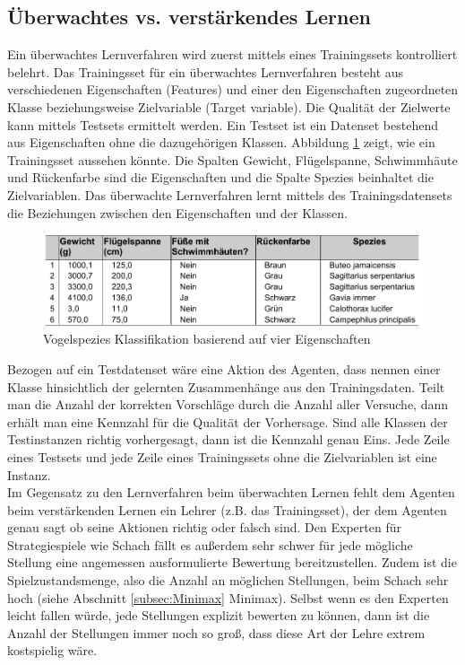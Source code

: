 \subsection{Überwachtes \acs{vs.} verstärkendes Lernen}
Ein überwachtes Lernverfahren wird zuerst mittels eines Trainingssets kontrolliert belehrt. Das Trainingsset für ein überwachtes Lernverfahren besteht aus verschiedenen Eigenschaften (Features) und einer den Eigenschaften zugeordneten Klasse beziehungsweise Zielvariable (Target variable). Die Qualität der Zielwerte kann mittels Testsets ermittelt werden. Ein Testset ist ein Datenset bestehend aus Eigenschaften ohne die dazugehörigen Klassen. Abbildung \ref{fig:vogel_spezies} zeigt, wie ein Trainingsset aussehen könnte\cite[8]{Harrington}. Die Spalten Gewicht, Flügelspanne, Schwimmhäute und Rückenfarbe sind die Eigenschaften und die Spalte Spezies beinhaltet die Zielvariablen. Das überwachte Lernverfahren lernt mittels des Trainingsdatensets die Beziehungen zwischen den Eigenschaften und der Klassen. \\

\begin{figure}[!htbp]
  \centering
  \includegraphics[scale = 0.89]{inhalt/abbildungen/vogel_spezies.pdf}
  \caption{Vogelspezies Klassifikation basierend auf vier Eigenschaften}
  \label{fig:vogel_spezies}
\end{figure} 

Bezogen auf ein Testdatenset wäre eine Aktion des Agenten, dass nennen einer Klasse hinsichtlich der gelernten Zusammenhänge aus den Trainingsdaten. Teilt man die Anzahl der korrekten Vorschläge durch die Anzahl aller Versuche, dann erhält man eine Kennzahl für die Qualität der Vorhersage. Sind alle Klassen der Testinstanzen richtig vorhergesagt, dann ist die Kennzahl genau Eins. Jede Zeile eines Testsets und jede Zeile eines Trainingssets ohne die Zielvariablen ist eine Instanz. \\

Im Gegensatz zu den Lernverfahren beim überwachten Lernen fehlt dem Agenten beim verstärkenden Lernen ein Lehrer (z.B. das Trainingsset), der dem Agenten genau sagt ob seine Aktionen richtig oder falsch sind. Den Experten für Strategiespiele wie Schach fällt es außerdem sehr schwer für jede mögliche Stellung eine angemessen ausformulierte Bewertung bereitzustellen. Zudem ist die Spielzustandsmenge, also die Anzahl an möglichen Stellungen, beim Schach sehr hoch (siehe Abschnitt \ref{subsec:Minimax} Minimax). Selbst wenn es den Experten leicht fallen würde, jede Stellungen explizit bewerten zu können, dann ist die Anzahl der Stellungen immer noch so groß, dass diese Art der Lehre extrem kostspielig wäre. \\

